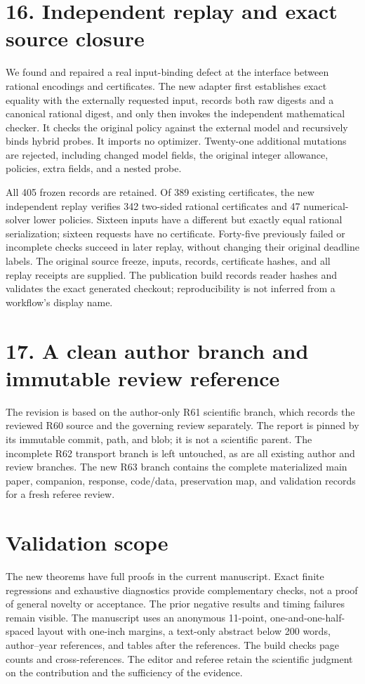 \section*{16. Independent replay and exact source closure}
We found and repaired a real input-binding defect at the interface between rational encodings and certificates. The new adapter first establishes exact equality with the externally requested input, records both raw digests and a canonical rational digest, and only then invokes the independent mathematical checker. It checks the original policy against the external model and recursively binds hybrid probes. It imports no optimizer. Twenty-one additional mutations are rejected, including changed model fields, the original integer allowance, policies, extra fields, and a nested probe.

All 405 frozen records are retained. Of 389 existing certificates, the new independent replay verifies 342 two-sided rational certificates and 47 numerical-solver lower policies. Sixteen inputs have a different but exactly equal rational serialization; sixteen requests have no certificate. Forty-five previously failed or incomplete checks succeed in later replay, without changing their original deadline labels. The original source freeze, inputs, records, certificate hashes, and all replay receipts are supplied. The publication build records reader hashes and validates the exact generated checkout; reproducibility is not inferred from a workflow's display name.

\section*{17. A clean author branch and immutable review reference}
The revision is based on the author-only R61 scientific branch, which records the reviewed R60 source and the governing review separately. The report is pinned by its immutable commit, path, and blob; it is not a scientific parent. The incomplete R62 transport branch is left untouched, as are all existing author and review branches. The new R63 branch contains the complete materialized main paper, companion, response, code/data, preservation map, and validation records for a fresh referee review.

\section*{Validation scope}
The new theorems have full proofs in the current manuscript. Exact finite regressions and exhaustive diagnostics provide complementary checks, not a proof of general novelty or acceptance. The prior negative results and timing failures remain visible. The manuscript uses an anonymous 11-point, one-and-one-half-spaced layout with one-inch margins, a text-only abstract below 200 words, author--year references, and tables after the references. The build checks page counts and cross-references. The editor and referee retain the scientific judgment on the contribution and the sufficiency of the evidence.
